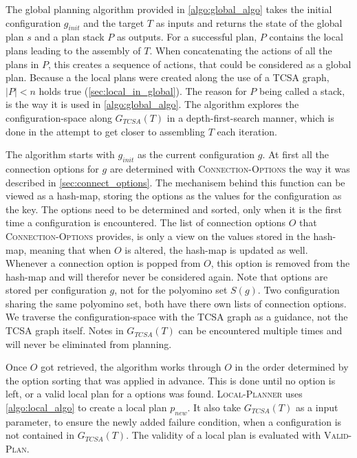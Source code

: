 The global planning algorithm provided in \autoref{algo:global_algo} takes the initial configuration $g_{init}$ and the target $T$ as inputs and returns the state of the global plan $s$ and a plan stack $P$ as outputs.
For a successful plan, $P$ contains the local plans leading to the assembly of $T$.
When concatenating the actions of all the plans in $P$, this creates a sequence of actions, that could be considered as a global plan.
Because a the local plans were created along the use of a TCSA graph, $|P| < n$ holds true (\autoref{sec:local_in_global}).
The reason for $P$ being called a stack, is the way it is used in \autoref{algo:global_algo}.
The algorithm explores the configuration-space along $G_{TCSA}(T)$ in a depth-first-search manner, which is done in the attempt to get closer to assembling $T$ each iteration.

The algorithm starts with $g_{init}$ as the current configuration $g$.
At first all the connection options for $g$ are determined with {\scshape Connection-Options} the way it was described in \autoref{sec:connect_options}.
The mechanisem behind this function can be viewed as a hash-map, storing the options as the values for the configuration as the key.
The options need to be determined and sorted, only when it is the first time a configuration is encountered.
The list of connection options $O$ that {\scshape Connection-Options} provides, is only a view on the values stored in the hash-map, meaning that when $O$ is altered, the hash-map is updated as well.
Whenever a connection option is popped from $O$, this option is removed from the hash-map and will therefor never be considered again.
Note that options are stored per configuration $g$, not for the polyomino set $S(g)$.
Two configuration sharing the same polyomino set, both have there own lists of connection options.
We traverse the configuration-space with the TCSA graph as a guidance, not the TCSA graph itself.
Notes in $G_{TCSA}(T)$ can be encountered multiple times and will never be eliminated from planning.

Once $O$ got retrieved, the algorithm works through $O$ in the order determined by the option sorting that was applied in advance.
This is done until no option is left, or a valid local plan for a options was found.
{\scshape Local-Planner} uses \autoref{algo:local_algo} to create a local plan $p_{new}$.
It also take $G_{TCSA}(T)$ as a input parameter, to ensure the newly added failure condition, when a configuration is not contained in $G_{TCSA}(T)$.
The validity of a local plan is evaluated with {\scshape Valid-Plan}.

